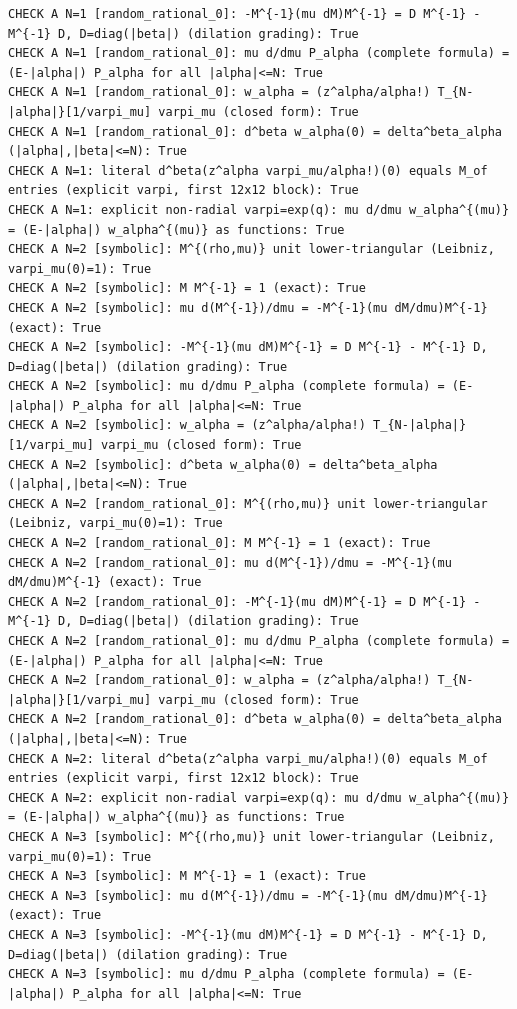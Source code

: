 \documentclass{article}
\theoremstyle{remark}
\begin{document}
\begin{lstlisting}
CHECK A N=1 [random_rational_0]: -M^{-1}(mu dM)M^{-1} = D M^{-1} - M^{-1} D, D=diag(|beta|) (dilation grading): True
CHECK A N=1 [random_rational_0]: mu d/dmu P_alpha (complete formula) = (E-|alpha|) P_alpha for all |alpha|<=N: True
CHECK A N=1 [random_rational_0]: w_alpha = (z^alpha/alpha!) T_{N-|alpha|}[1/varpi_mu] varpi_mu (closed form): True
CHECK A N=1 [random_rational_0]: d^beta w_alpha(0) = delta^beta_alpha (|alpha|,|beta|<=N): True
CHECK A N=1: literal d^beta(z^alpha varpi_mu/alpha!)(0) equals M_of entries (explicit varpi, first 12x12 block): True
CHECK A N=1: explicit non-radial varpi=exp(q): mu d/dmu w_alpha^{(mu)} = (E-|alpha|) w_alpha^{(mu)} as functions: True
CHECK A N=2 [symbolic]: M^{(rho,mu)} unit lower-triangular (Leibniz, varpi_mu(0)=1): True
CHECK A N=2 [symbolic]: M M^{-1} = 1 (exact): True
CHECK A N=2 [symbolic]: mu d(M^{-1})/dmu = -M^{-1}(mu dM/dmu)M^{-1} (exact): True
CHECK A N=2 [symbolic]: -M^{-1}(mu dM)M^{-1} = D M^{-1} - M^{-1} D, D=diag(|beta|) (dilation grading): True
CHECK A N=2 [symbolic]: mu d/dmu P_alpha (complete formula) = (E-|alpha|) P_alpha for all |alpha|<=N: True
CHECK A N=2 [symbolic]: w_alpha = (z^alpha/alpha!) T_{N-|alpha|}[1/varpi_mu] varpi_mu (closed form): True
CHECK A N=2 [symbolic]: d^beta w_alpha(0) = delta^beta_alpha (|alpha|,|beta|<=N): True
CHECK A N=2 [random_rational_0]: M^{(rho,mu)} unit lower-triangular (Leibniz, varpi_mu(0)=1): True
CHECK A N=2 [random_rational_0]: M M^{-1} = 1 (exact): True
CHECK A N=2 [random_rational_0]: mu d(M^{-1})/dmu = -M^{-1}(mu dM/dmu)M^{-1} (exact): True
CHECK A N=2 [random_rational_0]: -M^{-1}(mu dM)M^{-1} = D M^{-1} - M^{-1} D, D=diag(|beta|) (dilation grading): True
CHECK A N=2 [random_rational_0]: mu d/dmu P_alpha (complete formula) = (E-|alpha|) P_alpha for all |alpha|<=N: True
CHECK A N=2 [random_rational_0]: w_alpha = (z^alpha/alpha!) T_{N-|alpha|}[1/varpi_mu] varpi_mu (closed form): True
CHECK A N=2 [random_rational_0]: d^beta w_alpha(0) = delta^beta_alpha (|alpha|,|beta|<=N): True
CHECK A N=2: literal d^beta(z^alpha varpi_mu/alpha!)(0) equals M_of entries (explicit varpi, first 12x12 block): True
CHECK A N=2: explicit non-radial varpi=exp(q): mu d/dmu w_alpha^{(mu)} = (E-|alpha|) w_alpha^{(mu)} as functions: True
CHECK A N=3 [symbolic]: M^{(rho,mu)} unit lower-triangular (Leibniz, varpi_mu(0)=1): True
CHECK A N=3 [symbolic]: M M^{-1} = 1 (exact): True
CHECK A N=3 [symbolic]: mu d(M^{-1})/dmu = -M^{-1}(mu dM/dmu)M^{-1} (exact): True
CHECK A N=3 [symbolic]: -M^{-1}(mu dM)M^{-1} = D M^{-1} - M^{-1} D, D=diag(|beta|) (dilation grading): True
CHECK A N=3 [symbolic]: mu d/dmu P_alpha (complete formula) = (E-|alpha|) P_alpha for all |alpha|<=N: True

\end{lstlisting}
\end{document}
